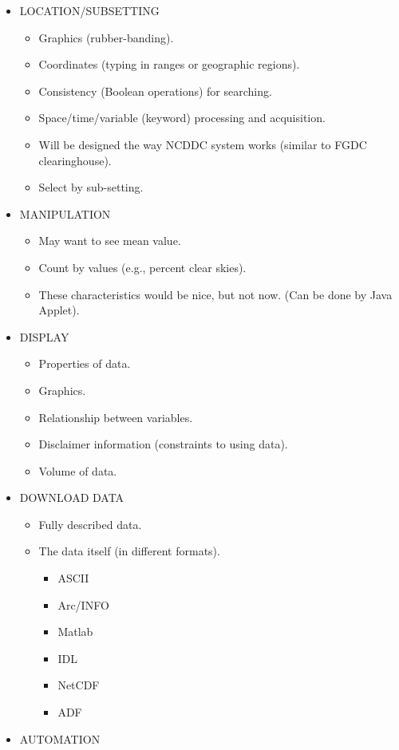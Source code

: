 \begin{itemize}

\item LOCATION/SUBSETTING 
\begin{itemize}
\item Graphics (rubber-banding).
\item Coordinates (typing in ranges or geographic regions).
\item Consistency (Boolean operations) for searching.
\item Space/time/variable (keyword) processing and acquisition.
\item Will be designed the way NCDDC system works (similar to FGDC clearinghouse).
\item Select by sub-setting.
\end{itemize}

\item MANIPULATION
\begin{itemize}
\item May want to see mean value.
\item Count by values (e.g., percent clear skies).
\item These characteristics would be nice, but not now. (Can be done
  by Java Applet).
\end{itemize}

\item DISPLAY
\begin{itemize}
\item Properties of data.
\item Graphics.
\item Relationship between variables.
\item Disclaimer information (constraints to using data).
\item Volume of data.
\end{itemize}

\item DOWNLOAD DATA
\begin{itemize}
\item Fully described data.
\item The data itself (in different formats).
\begin{itemize}
  \item ASCII
  \item Arc/INFO
  \item Matlab
  \item IDL
  \item NetCDF
  \item ADF
\end{itemize}
\end{itemize}

\item AUTOMATION
\end{itemize}

